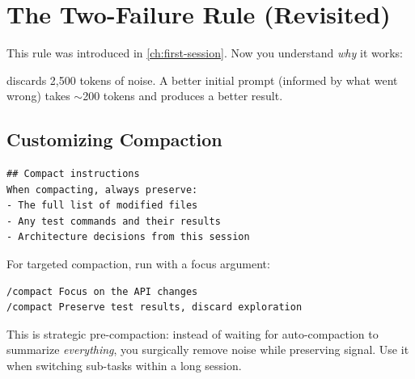 
\section{The Two-Failure Rule (Revisited)}
\label{sec:two-failure}

This rule was introduced in \cref{ch:first-session}.
Now you understand \emph{why} it works:


 discards 2,500 tokens of noise.
A better initial prompt (informed by what went wrong)
takes $\sim$200 tokens and produces a better result.

\subsection{Customizing Compaction}


\begin{verbatim}
## Compact instructions
When compacting, always preserve:
- The full list of modified files
- Any test commands and their results
- Architecture decisions from this session
\end{verbatim}

For targeted compaction, run  with a focus argument:

\begin{verbatim}
/compact Focus on the API changes
/compact Preserve test results, discard exploration
\end{verbatim}

This is strategic pre-compaction: instead of waiting for auto-compaction
to summarize \emph{everything}, you surgically remove noise while
preserving signal. Use it when switching sub-tasks within a long session.

